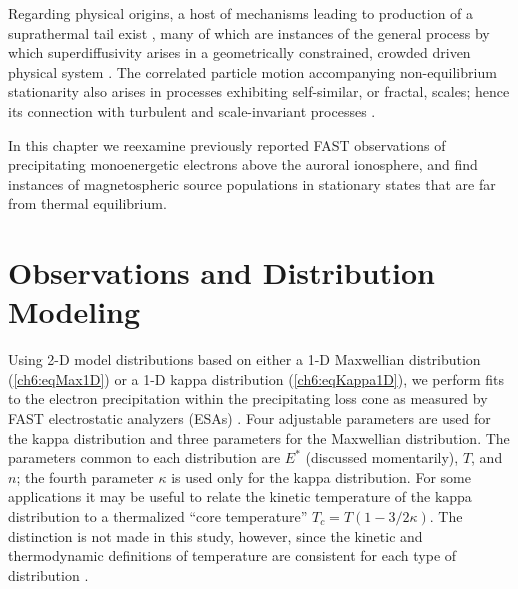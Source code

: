   Regarding physical origins, a host of mechanisms leading to production of a
  suprathermal tail exist \citep[e.g., review by][]{Pierrard2010}, many of which
  are instances of the general process by which superdiffusivity arises in a
  geometrically constrained, crowded driven physical system
  \citep{Benichou2013}.  The correlated particle motion accompanying
  non-equilibrium stationarity also arises in processes exhibiting self-similar,
  or fractal, scales; hence its connection with turbulent and scale-invariant
  processes \citep{West1990,Treumann1999a,Leubner2004}.

  In this chapter we reexamine previously reported FAST observations of
  precipitating monoenergetic electrons above the auroral ionosphere, and find
  instances of magnetospheric source populations in stationary states that are
  far from thermal equilibrium.

  \section{Observations and Distribution Modeling}

  Using 2-D model distributions based on either a 1-D Maxwellian distribution
  (\ref{ch6:eqMax1D}) or a 1-D kappa distribution (\ref{ch6:eqKappa1D}), we
  perform fits to the electron precipitation within the precipitating loss cone
  as measured by FAST electrostatic analyzers (ESAs) \citep{Carlson2001}. Four
  adjustable parameters are used for the kappa distribution and three parameters
  for the Maxwellian distribution. The parameters common to each distribution
  are $E^*$ (discussed momentarily), $T$, and $n$; the fourth parameter $\kappa$
  is used only for the kappa distribution. For some applications
  \citep[e.g.,][]{Sutherland2012} it may be useful to relate the kinetic
  temperature of the kappa distribution to a thermalized ``core temperature''
  $T_c = T (1-3/2 \kappa)$. The distinction is not made in this study, however,
  since the kinetic and thermodynamic definitions of temperature are consistent
  for each type of distribution \citep{Livadiotis2010}.

